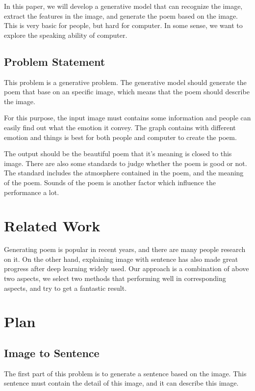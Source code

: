 \documentclass[10pt,twocolumn,letterpaper]{article}
\begin{document}
In this paper, we will develop a generative model that can recognize the image, extract the features in the image, and generate the poem based on the image. This is very basic for people, but hard for computer. In some sense, we want to explore the speaking ability of computer.
\subsection{Problem Statement}
This problem is a generative problem. The generative model should generate the poem that base on an specific image, which means that the poem should describe the image. 

For this purpose, the input image must contains some information and people can easily find out what the emotion it convey. The graph contains with different emotion and things is best for both people and computer to create the poem.

The output should be the beautiful poem that it's meaning is closed to this image. There are also some standards to judge whether the poem is good or not. The standard includes the atmosphere contained in the poem, and the meaning of the poem. Sounds of the poem is another factor which influence the performance a lot.


\section{Related Work}
	Generating poem is popular in recent years, and there are many people research on it. On the other hand, explaining image with sentence has also made great progress after deep learning widely used. Our approach is a combination of above two aspects, we select two methods that performing well in corresponding aspects, and try to get a fantastic result.
\section{Plan}
\subsection{Image to Sentence}
The first part of this problem is to generate a sentence based on the image. This sentence must contain the detail of this image, and it can describe this image.
\end{document}
